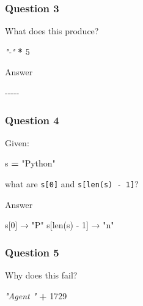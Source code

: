 \documentclass[
]{article}
\newenvironment{Shaded}{\begin{snugshade}}{\end{snugshade}}
\newcommand{\CommentTok}[1]{\textcolor[rgb]{0.56,0.35,0.01}{\textit{#1}}}
\newcommand{\DecValTok}[1]{\textcolor[rgb]{0.00,0.00,0.81}{#1}}
\newcommand{\NormalTok}[1]{#1}
\newcommand{\OperatorTok}[1]{\textcolor[rgb]{0.81,0.36,0.00}{\textbf{#1}}}
\newcommand{\StringTok}[1]{\textcolor[rgb]{0.31,0.60,0.02}{#1}}
\begin{document}
\subsubsection{Question 3}\label{question-3-3}

What does this produce?

\begin{Shaded}
\begin{Highlighting}[]
\CommentTok{"{-}"} \OperatorTok{*} \DecValTok{5}
\end{Highlighting}
\end{Shaded}

Answer

\begin{Shaded}
\begin{Highlighting}[]
\NormalTok{{-}{-}{-}{-}{-}}
\end{Highlighting}
\end{Shaded}

\subsubsection{Question 4}\label{question-4-2}

Given:

\begin{Shaded}
\begin{Highlighting}[]
\NormalTok{s }\OperatorTok{=} \StringTok{"Python"}
\end{Highlighting}
\end{Shaded}

what are \texttt{s{[}0{]}} and \texttt{s{[}len(s)\ -\ 1{]}}?

Answer

\begin{Shaded}
\begin{Highlighting}[]
\NormalTok{s[0]            → "P"}
\NormalTok{s[len(s) {-} 1]   → "n"}
\end{Highlighting}
\end{Shaded}

\subsubsection{Question 5}\label{question-5-2}

Why does this fail?

\begin{Shaded}
\begin{Highlighting}[]
\CommentTok{"Agent "} \OperatorTok{+} \DecValTok{1729}
\end{Highlighting}
\end{Shaded}
\end{document}
